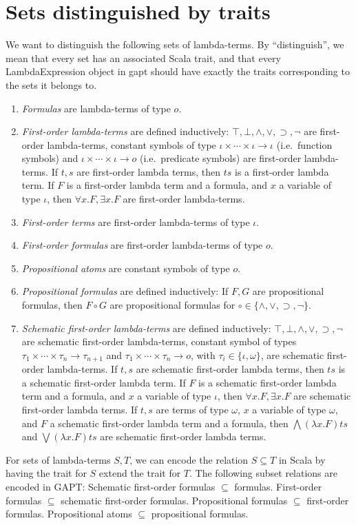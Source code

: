 \documentclass[11pt,a4paper]{article}
\newcommand{\omicron}{o}
\newcommand{\ftype}{\omicron}
\newcommand{\itype}{\iota}
\newcommand{\atype}{\omega}
\newcommand{\impl}{\supset}
\begin{document}
\section{Sets distinguished by traits}
%
We want to distinguish the following sets of lambda-terms. By ``distinguish'', we mean that every set
has an associated Scala trait, and that every LambdaExpression object in gapt should have exactly the
traits corresponding to the sets it belongs to.
%
\begin{enumerate}
  \item {\em Formulas} are lambda-terms of type $\ftype$.
  \item {\em First-order lambda-terms} are defined inductively: $\top,\bot,\land,\lor,\impl,\neg$ 
    are first-order lambda-terms,
    constant symbols of type $\itype \times \cdots \times \itype \to \itype$ (i.e.~function symbols)
    and $\itype\times\cdots\times \itype \to \ftype$ (i.e.~predicate symbols)
    are first-order lambda-terms. If $t, s$ are first-order lambda terms, then $ts$ is a first-order lambda term.
    If $F$ is a first-order lambda term and a formula, and $x$ a variable of type $\itype$,
    then $\forall x.F, \exists x.F$ are first-order lambda-terms.
  \item {\em First-order terms} are first-order lambda-terms of type $\itype$.
  \item {\em First-order formulas} are first-order lambda-terms of type $\ftype$.
  \item {\em Propositional atoms} are constant symbols of type $\ftype$.
  \item {\em Propositional formulas} are defined inductively: If $F, G$ are propositional 
    formulas, then $F\circ G$ are propositional formulas for $\circ\in\{\land,\lor,\impl,\neg\}$.
  \item {\em Schematic first-order lambda-terms} are defined inductively:
    $\top,\bot,\land,\lor,\impl,\neg$ are schematic first-order
    lambda-terms, constant symbol of types $\tau_1\times \cdots \times \tau_n \to \tau_{n+1}$
    and $\tau_1\times \cdots \times \tau_n \to \ftype$, with $\tau_i\in\{\itype,\atype\}$, 
    are schematic first-order lambda-terms. If $t, s$ are schematic first-order lambda terms, then $ts$ is a schematic
    first-order lambda term. If $F$ is a schematic first-order lambda term and a formula, and $x$ a variable of type 
    $\itype$, then $\forall x.F, \exists x.F$ are schematic first-order lambda terms. If $t,s$ are terms of type
    $\atype$, $x$ a variable of type $\atype$, and $F$ a schematic first-order lambda term and a formula, then
    $\bigwedge(\lambda x.F)ts$ and $\bigvee(\lambda x.F)ts$ are schematic first-order lambda terms.
   \end{enumerate}
%
For sets of lambda-terms $S,T$, we can encode the relation $S\subseteq T$ in Scala by
having the trait for $S$ extend the trait for $T$.
The following subset relations are encoded in GAPT: 
Schematic first-order formulas $\subseteq$ formulas.
First-order formulas $\subseteq$ schematic first-order formulas.
Propositional formulas $\subseteq$ first-order formulas.
Propositional atoms $\subseteq$ propositional formulas.
\end{document}
